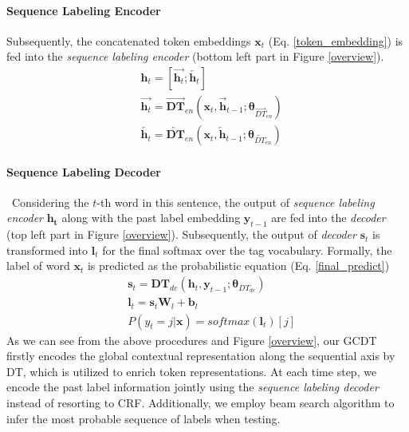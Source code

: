 \documentclass[11pt,a4paper]{article}
\begin{document}
\paragraph{Sequence Labeling Encoder}
Subsequently, the concatenated token embeddings $\mathbf{x}_t$ (Eq. \ref{token_embedding}) is fed into the \emph{sequence labeling encoder} (bottom left part in Figure \ref{overview}).
\begin{align}
& \mathbf{h}_t = [\overrightarrow{\mathbf{h}_t}; \overleftarrow{\mathbf{h}_t}] \\
& \overrightarrow{\mathbf{h}_t} = \overrightarrow{\mathbf{DT}}_{en}(\mathbf{x}_t, \overrightarrow{\mathbf{h}}_{t-1}; \mathbf{\theta}_{\overrightarrow{{DT}}_{en}}) \\
& \overleftarrow{\mathbf{h}_t} = \overleftarrow{\mathbf{DT}}_{en}(\mathbf{x}_t, \overleftarrow{\mathbf{h}}_{t-1}; \mathbf{\theta}_{\overleftarrow{{DT}}_{en}})
\end{align}

\paragraph{Sequence Labeling Decoder} 
\ Considering the $t$-th word in this sentence, the output of \emph{sequence labeling encoder} $\mathbf{h_t}$ along with the past label embedding $\mathbf{y}_{t-1}$ are fed into the \emph{decoder} (top left part in Figure \ref{overview}). Subsequently, 
the output of \emph{decoder} $\mathbf{s}_t$ is transformed into $\mathbf{l}_t$ for the final softmax over the tag vocabulary. Formally, the label of word $\mathbf{x}_t$ is predicted as the probabilistic equation (Eq. \ref{final_predict})
\begin{align}
& \mathbf{s}_t = \mathbf{DT}_{de}(\mathbf{h}_t, \mathbf{y}_{t-1}; \mathbf{\theta}_{DT_{de}}) \\
& \mathbf{l}_t = \mathbf{s}_t \mathbf{W}_l + \mathbf{b}_l \\
& P (y_t = j | \mathbf{x}) = softmax(\mathbf{l}_t) [j] \label{final_predict} 
\end{align}
As we can see from the above procedures and Figure \ref{overview}, our GCDT firstly encodes the global contextual representation along the sequential axis by DT, which is utilized to enrich token representations.
At each time step, we encode the past label information jointly using the \emph{sequence labeling decoder} instead of resorting to CRF.
Additionally, we employ beam search algorithm to infer the most probable sequence of labels when testing.
\end{document}
